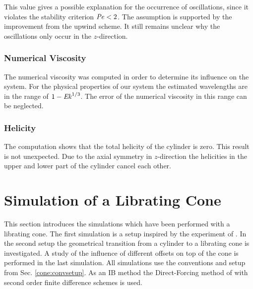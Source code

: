 This value gives a possible explanation for the occurrence of oscillations,
since it violates the stability criterion $\mbox{\textit{Pe}}<2$.
The assumption is supported by the improvement from the upwind scheme.
It still remains unclear why the oscillations only occur in the $z$-direction.


\subsubsection{Numerical Viscosity}

The numerical viscosity was computed in order to determine its influence on the system.
For the physical properties of our system the estimated wavelengths are in the range of $1 - \mbox{\textit{Ek}}^{1/3}$.
The error of the numerical viscosity in this range can be neglected.

\subsubsection{Helicity}

The computation shows that the total helicity of the cylinder is zero.
This result is not unexpected.
Due to the axial symmetry in $z$-direction the helicities in the upper and lower part of the cylinder cancel each other.

\newpage

\section{Simulation of a Librating Cone}

This section introduces the simulations which have been performed
with a librating cone. The first simulation is a setup inspired by the experiment of \citep{Beardsley1970}.
In the second setup the geometrical transition from a cylinder to a librating cone is investigated.
A study of the influence of different offsets on top of the cone is performed in the last simulation.
All simulations use the conventions and setup from Sec. \ref{cone:convsetup}.
As an IB method the Direct-Forcing method of with second order finite difference schemes is used.

